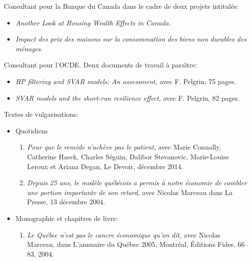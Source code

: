 \begin{description}
\item Consultant pour la Banque du Canada dans le cadre de deux projets intitul\'es: 
      \begin{itemize}
            \item {\em Another Look at Housing Wealth Effects in Canada.} 
            \item {\em Impact des prix des maisons sur la consommation des biens non durables des m\'enages.} 
      \end{itemize}
\item Consultant pour l'OCDE. Deux documents de travail \`a para\^{\i}tre:
      \begin{itemize}
            \item {\em HP filtering and SVAR models: An assessment,} avec F. Pelgrin, 75 pages.
            \item {\em SVAR models and the short-run resilience effect,} avec F. Pelgrin, 82 pages.
      \end{itemize}

\item Textes de vulgarisations:
\begin{itemize}
            \item Quotidiens
                    \begin{enumerate}
                           \item {\em Pour que le rem\`ede n'ach\`eve pas le patient,} avec Marie Connally, Catherine Haeck, Charles S\'eguin, Dalibor Stevanovic, Marie-Louise Leroux et Ariana Degan, Le Devoir, d\'ecembre 2014.
                           \item {\em Depuis 25 ans, le mod\`ele qu\'eb\'ecois a permis \`a notre \'economie de combler une portion importante de son retard,} avec Nicolas Marceau dans La Presse, 13 d\'ecembre 2004.
                     \end{enumerate}      
            \item Monographie et chapitres de livre:
                    \begin{enumerate}
                            \item {\em Le Qu\'ebec n'est pas le cancre \'economique qu'on dit,} avec Nicolas Marceau, dans L'annuaire du Qu\'ebec 2005, Montr\'eal, \'Editions Fides, 66--83, 2004.
                   \end{enumerate}                  
            \end{itemize}                  
\end{description}

\vfill\eject

